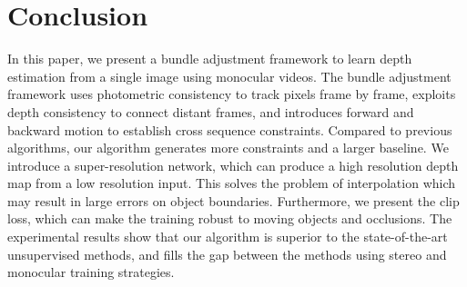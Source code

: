 \documentclass[10pt,twocolumn,letterpaper]{article}
\begin{document}

\section{Conclusion}
In this paper, we present a bundle adjustment framework to learn depth estimation from a single image using monocular videos. The  bundle adjustment framework uses photometric consistency to track pixels frame by frame, exploits depth consistency to connect distant frames, and introduces forward and backward motion to establish cross sequence constraints. Compared to previous algorithms, our algorithm generates more constraints and a larger baseline. We introduce a super-resolution network, which can produce a high resolution depth map  from a low resolution input. This solves the problem of interpolation which may result in large errors on object boundaries. Furthermore, we present the clip loss, which can make the training robust to moving objects and occlusions. The experimental results show that our algorithm is superior to the state-of-the-art unsupervised methods, and fills the gap between the methods using stereo and monocular training strategies. 



{\small


}
\end{document}

